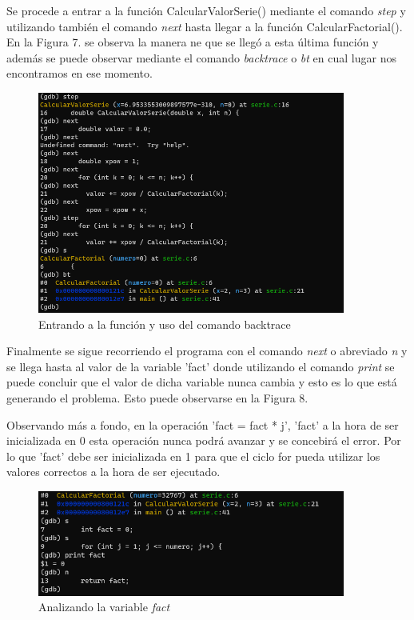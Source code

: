 \documentclass[12pt,a4paper]{article}
\begin{document}
Se procede a entrar a la función CalcularValorSerie() mediante el comando \textit{step} y utilizando también el comando \textit{next} hasta llegar a la función CalcularFactorial(). En la Figura 7. se observa la manera ne que se llegó a esta última función y además se puede observar mediante el comando \textit{backtrace} o \textit{bt} en cual lugar nos encontramos en ese momento.

\begin{figure}[H]
    \centering
    \center
    \includegraphics[width=0.9\textwidth]{Fotos_Lab6/Figura7.png}
    \caption{Entrando a la función y uso del comando backtrace}
    \label{1}
\end{figure}

Finalmente se sigue recorriendo el programa con el comando \textit{next} o abreviado \textit{n} y se llega hasta al valor de la variable 'fact' donde utilizando el comando \textit{print} se puede concluir que el valor de dicha variable nunca cambia y esto es lo que está generando el problema. Esto puede observarse en la Figura 8.

Observando más a fondo, en la operación 'fact = fact * j', 'fact' a la hora de ser inicializada en 0 esta operación nunca podrá avanzar y se concebirá el error. Por lo que 'fact' debe ser inicializada en 1 para que el ciclo for pueda utilizar los valores correctos a la hora de ser ejecutado.

\begin{figure}[H]
    \centering
    \center
    \includegraphics[width=0.9\textwidth]{Fotos_Lab6/Figura8.png}
    \caption{Analizando la variable \textit{fact}}
    \label{1}
\end{figure}
\end{document}
